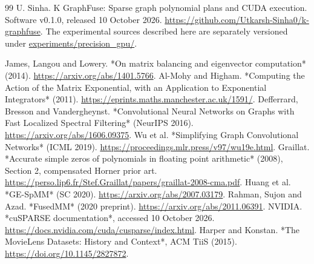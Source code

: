 \documentclass[10pt]{article}
\begin{document}
\begin{thebibliography}{99}
U. Sinha.
\newblock K GraphFuse: Sparse graph polynomial plans and CUDA execution.
\newblock Software v0.1.0, released 10 October 2026.
\newblock \url{https://github.com/Utkarsh-Sinha0/k-graphfuse}.
\newblock The experimental sources described here are separately versioned under \url{experiments/precision_gpu/}.

James, Langou and Lowery. *On matrix balancing and eigenvector computation* (2014).
\url{https://arxiv.org/abs/1401.5766}.
Al-Mohy and Higham. *Computing the Action of the Matrix Exponential, with an Application to Exponential Integrators* (2011).
\url{https://eprints.maths.manchester.ac.uk/1591/}.
Defferrard, Bresson and Vandergheynst. *Convolutional Neural Networks on Graphs with Fast Localized Spectral Filtering* (NeurIPS 2016).
\url{https://arxiv.org/abs/1606.09375}.
Wu et al. *Simplifying Graph Convolutional Networks* (ICML 2019).
\url{https://proceedings.mlr.press/v97/wu19e.html}.
Graillat. *Accurate simple zeros of polynomials in floating point arithmetic* (2008), Section 2, compensated Horner prior art.
\url{https://perso.lip6.fr/Stef.Graillat/papers/graillat-2008-cma.pdf}.
Huang et al. *GE-SpMM* (SC 2020).
\url{https://arxiv.org/abs/2007.03179}.
Rahman, Sujon and Azad. *FusedMM* (2020 preprint).
\url{https://arxiv.org/abs/2011.06391}.
NVIDIA. *cuSPARSE documentation*, accessed 10 October 2026.
\url{https://docs.nvidia.com/cuda/cusparse/index.html}.
Harper and Konstan. *The MovieLens Datasets: History and Context*, ACM TiiS (2015).
\url{https://doi.org/10.1145/2827872}.
\end{thebibliography}
\end{document}
